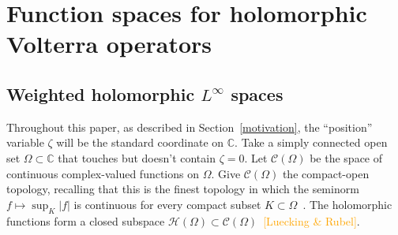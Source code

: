 \documentclass{article}
\theoremstyle{plain}
\newcommand{\C}{\mathbb{C}}
\newcommand{\cont}{\mathcal{C}}
\newcommand{\holo}{\mathcal{H}}
\newcommand{\holoL}[1]{\mathcal{H}L^{#1}} %
\begin{document}


\section{Function spaces for holomorphic Volterra operators}\label{fn-spaces}
\subsection{Weighted holomorphic $L^\infty$ spaces}
Throughout this paper, as described in Section~\ref{motivation}, the ``position'' variable $\zeta$ will be the standard coordinate on $\C$. Take a simply connected open set $\Omega \subset \C$ that touches but doesn't contain $\zeta = 0$. Let $\cont(\Omega)$ be the space of continuous complex-valued functions on $\Omega$. Give $\cont(\Omega)$ the compact-open topology, recalling that this is the finest topology in which the seminorm $f \mapsto \sup_K |f|$ is continuous for every compact subset $K \subset \Omega$~\cite[Example~2.6 and \S 4 notes]{fnl-cpx-anal}. The holomorphic functions form a closed subspace $\holo(\Omega) \subset \cont(\Omega)$~\cite[Proposition~3.14]{fnl-cpx-anal}\textcolor{orange}{[Luecking \& Rubel]}.
\end{document}
